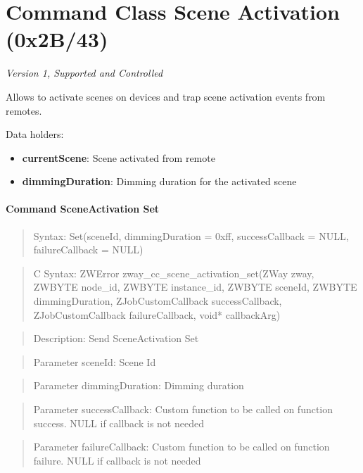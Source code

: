 \section{Command Class Scene Activation (0x2B/43)}

\textit{Version 1, Supported and Controlled}
\newline

Allows to activate scenes on devices and trap scene activation events from remotes.
\newline

\noindent
Data holders:

\begin{itemize}
\item \textbf{currentScene}: Scene activated from remote
\item \textbf{dimmingDuration}: Dimming duration for the activated scene
\end{itemize}

\paragraph{Command SceneActivation Set}
\begin{quote}Syntax: Set(sceneId, dimmingDuration = 0xff, successCallback = NULL, failureCallback = NULL)\end{quote}
\begin{quote}C Syntax: ZWError zway\_cc\_scene\_activation\_set(ZWay zway, ZWBYTE node\_id, ZWBYTE instance\_id, ZWBYTE sceneId, ZWBYTE dimmingDuration, ZJobCustomCallback successCallback, ZJobCustomCallback failureCallback, void* callbackArg)\end{quote}
\begin{quote}Description: Send SceneActivation Set\end{quote}
\begin{quote}Parameter sceneId: Scene Id\end{quote}
\begin{quote}Parameter dimmingDuration: Dimming duration\end{quote}
\begin{quote}Parameter successCallback: Custom function to be called on function success. NULL if callback is not needed\end{quote}
\begin{quote}Parameter failureCallback: Custom function to be called on function failure. NULL if callback is not needed\end{quote}



